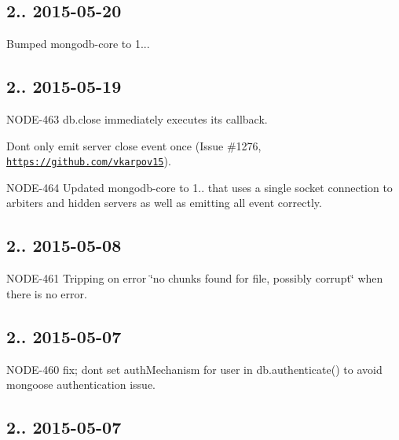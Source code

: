 \subsection*{2.. 2015-\/05-\/20 }


\begin{DoxyItemize}
\item Bumped mongodb-\/core to 1...
\end{DoxyItemize}

\subsection*{2.. 2015-\/05-\/19 }


\begin{DoxyItemize}
\item N\+O\+D\+E-\/463 db.\+close immediately executes its callback.
\item Don\textquotesingle{}t only emit server close event once (Issue \#1276, \href{https://github.com/vkarpov15}{\tt https\+://github.\+com/vkarpov15}).
\item N\+O\+D\+E-\/464 Updated mongodb-\/core to 1.. that uses a single socket connection to arbiters and hidden servers as well as emitting all event correctly.
\end{DoxyItemize}

\subsection*{2.. 2015-\/05-\/08 }


\begin{DoxyItemize}
\item N\+O\+D\+E-\/461 Tripping on error \char`\"{}no chunks found for file, possibly corrupt\char`\"{} when there is no error.
\end{DoxyItemize}

\subsection*{2.. 2015-\/05-\/07 }


\begin{DoxyItemize}
\item N\+O\+D\+E-\/460 fix; don\textquotesingle{}t set auth\+Mechanism for user in db.\+authenticate() to avoid mongoose authentication issue.
\end{DoxyItemize}

\subsection*{2.. 2015-\/05-\/07 }


